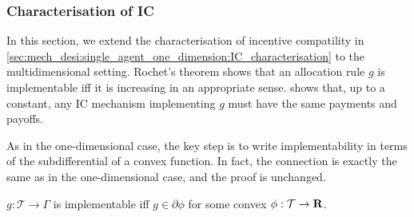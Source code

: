 \documentclass[11pt,letterpaper,reqno,oneside]{article}
\begin{document}
\subsubsection{Characterisation of IC}
\label{sec:mech_desi:single_agent_multiple_dimensions:IC_characterisation}

In this section, we extend the characterisation of incentive compatility in \cref{sec:mech_desi:single_agent_one_dimension:IC_characterisation} to the multidimensional setting. Rochet's theorem shows that an allocation rule $g$ is implementable iff it is increasing in an appropriate sense.  shows that, up to a constant, any IC mechanism implementing $g$ must have the same payments and payoffs.

As in the one-dimensional case, the key step is to write implementability in terms of the subdifferential of a convex function. In fact, the connection is exactly the same as in the one-dimensional case, and the proof is unchanged.
%
\begin{lemma}
	\label{lemma:implementable_subdifferential}
	$g : \mathcal{T} \to \Gamma$ is implementable iff $g \in \partial \phi$ for some convex $\phi : \mathcal{T} \to \mathbf{R}$.
\end{lemma}
\end{document}
